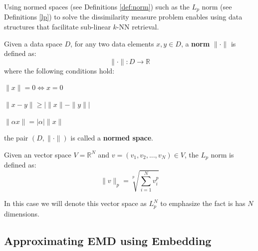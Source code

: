 \iftoggle{edit-mode}{\hspace{0pt}\marginpar{$L_p$ advantage and drawbacks}}{}
Using normed spaces (see Definitions \ref{def:norm}) such as the $L_p$ norm (see Definitions \ref{lp}) to solve the dissimilarity measure problem enables using data structures that facilitate sub-linear $k$-NN retrieval.

\begin{definition}
Given a data space $D$, for any two data elements  $x,y \in D$, a \textbf{norm} $\|\cdot\|$ is defined as:
\begin{equation}
\|\cdot\|: D \longrightarrow \mathbb{R}
\end{equation}
where the following conditions hold:
\begin{compactitem}
\item $\|x\|=0 \Leftrightarrow x=0$
\item $\|x-y\| \geq|\|x\|-\|y\||$
\item $\|\alpha x\|=|\alpha|\|x\|$
\end{compactitem}
the pair $\left(D,\|\cdot\|\right)$ is called a \textbf{normed space}.
\label{def:norm}
\end{definition}


\begin{definition}
Given an vector space $V=\mathbb{R}^N$ and $v=(v_1,v_2,...,v_N) \in V$, the $L_p$ norm is defined as:
\begin{equation}
\|v\|_p=\sqrt[p]{\sum\limits_{i=1}^N v_i^p}
\end{equation}
\label{lp}
\end{definition}
In this case we will denote this vector space as $L_p^N$ to emphasize the fact is has $N$ dimensions.

\subsection{Approximating EMD using Embedding}
\label{subsec:approximating_emd_using_embedding}

